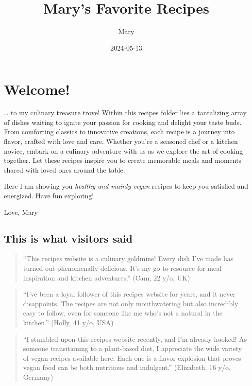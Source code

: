 \documentclass[
  letterpaper,
  DIV=11,
  numbers=noendperiod]{scrartcl}
\title{Mary's Favorite Recipes}
\author{Mary}
\date{2024-05-13}
\begin{document}
\maketitle

\section{Welcome!}\label{welcome}

\ldots{} to my culinary treasure trove! Within this recipes folder lies
a tantalizing array of dishes waiting to ignite your passion for cooking
and delight your taste buds. From comforting classics to innovative
creations, each recipe is a journey into flavor, crafted with love and
care. Whether you're a seasoned chef or a kitchen novice, embark on a
culinary adventure with us as we explore the art of cooking together.
Let these recipes inspire you to create memorable meals and moments
shared with loved ones around the table.

Here I am showing you \emph{healthy and mainly vegan} recipes to keep
you satisfied and energized. Have fun exploring!

Love, Mary

\subsection{This is what visitors
said}\label{this-is-what-visitors-said}

\begin{quote}
``This recipes website is a culinary goldmine! Every dish I've made has
turned out phenomenally delicious. It's my go-to resource for meal
inspiration and kitchen adventures.'' (Cam, 22 y/o, UK)
\end{quote}

\begin{quote}
``I've been a loyal follower of this recipes website for years, and it
never disappoints. The recipes are not only mouthwatering but also
incredibly easy to follow, even for someone like me who's not a natural
in the kitchen.'' (Holly, 41 y/o, USA)
\end{quote}

\begin{quote}
``I stumbled upon this recipes website recently, and I'm already hooked!
As someone transitioning to a plant-based diet, I appreciate the wide
variety of vegan recipes available here. Each one is a flavor explosion
that proves vegan food can be both nutritious and indulgent.''
(Elizabeth, 16 y/o, Germany)
\end{quote}
\end{document}
